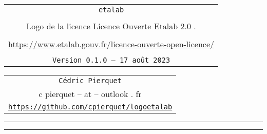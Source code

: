 \documentclass[french,11pt,a4paper]{article}
\def\TPversion{0.1.0}
\def\TPdate{17 août 2023}
\begin{document}
\pagestyle{fancy}

\thispagestyle{empty}

\begin{center}
	\begin{minipage}{0.75\linewidth}
	\begin{tcolorbox}[colframe=yellow,colback=yellow!15]
		\begin{center}
			\begin{tabular}{c}
				{\Huge \texttt{etalab}}\\
				\\
				{\LARGE Logo de la licence \og Licence Ouverte Etalab 2.0 \fg.} \\
				\\
				\url{https://www.etalab.gouv.fr/licence-ouverte-open-licence/} \\
				\\
				{\small \texttt{Version \TPversion{} -- \TPdate}}
		\end{tabular}
		\end{center}
	\end{tcolorbox}
\end{minipage}
\end{center}

\begin{center}
	\begin{tabular}{c}
	\texttt{Cédric Pierquet}\\
	{\ttfamily c pierquet -- at -- outlook . fr}\\
	\texttt{\url{https://github.com/cpierquet/logoetalab}}
\end{tabular}
\end{center}

\hrule


\hypertarget{matoc}{}

\tableofcontents

\vspace*{5mm}

\hrule

\vspace*{5mm}

\vfill

\hfill
{\Huge\sffamily\affloetalab[Legende]}
\hfill~

\bigskip

\hfill
{\Huge\loetalab*[Couleur=Bleu,Legende,TexteLegende={Licence Ouverte}]}
\hfill~

\vspace*{1cm}
\end{document}
